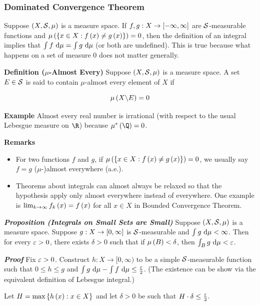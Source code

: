 \documentclass[
]{article}
\begin{document}
\hypertarget{dominated-convergence-theorem}{%
\subsubsection{Dominated Convergence
Theorem}\label{dominated-convergence-theorem}}

Suppose \(\pr{X,\S,\mu}\) is a measure space. If
\(f,g:X\to\br{-\infty,\infty}\) are \(\S\)-measurable functions and
\(\lm{\brace{x\in X:f\pr{x}\ne g\pr{x}}} = 0\), then the definition of
an integral implies that \(\int f\dm = \int g\dm\) (or both are
undefined). This is true because what happens on a set of measure \(0\)
does not matter generally.

\textbf{Definition (\(\mu\)-Almost Every)} Suppose \(\pr{X,\S,\mu}\) is
a measure space. A set \(E\in \S\) is said to contain \(\mu\)-almost
every element of \(X\) if

\[\lm{X\c E} = 0\]

\textbf{Example} Almost every real number is irrational (with respect to
the usual Lebesgue measure on \(\R\)) because \(\om{\Q} = 0\).

\textbf{Remarks}

\begin{itemize}
\item
  For two functions \(f\) and \(g\), if
  \(\lm{\brace{x\in X:f\pr{x}\ne g\pr{x}}} = 0\), we usually say
  \(f = g\) (\(\mu\)-)almost everywhere (a.e.).
\item
  Theorems about integrals can almost always be relaxed so that the
  hypothesis apply only almost everywhere instead of everywhere. One
  example is \(\lim_{k\to\infty}f_k\pr{x} = f\pr{x}\) for all \(x\in X\)
  in Bounded Convergence Theorem.
\end{itemize}

\emph{\textbf{Proposition (Integrals on Small Sets are Small)}} Suppose
\(\pr{X,\S,\mu}\) is a measure space. Suppose \(g:X\to\br{0,\infty}\) is
\(\S\)-measurable and \(\int g\dm <\infty\). Then for every \(\ve>0\),
there exists \(\delta>0\) such that if \(\lm{B}<\delta\), then
\(\int_{B}g\dm<\ve\).

\emph{\textbf{Proof}} Fix \(\ve>0\). Construct \(h:X\to [0,\infty)\) to
be a simple \(\S\)-measurable function such that \(0\le h\le g\) and
\(\int g\dm-\int f\dm \le \frac{\ve}2\). (The existence can be show via
the equivalent definition of Lebesgue integral.)

Let \(H = \max\brace{h\pr{x}:x\in X}\) and let \(\delta>0\) be such that
\(H\cdot \delta \le \frac{\ve}2\).
\end{document}
